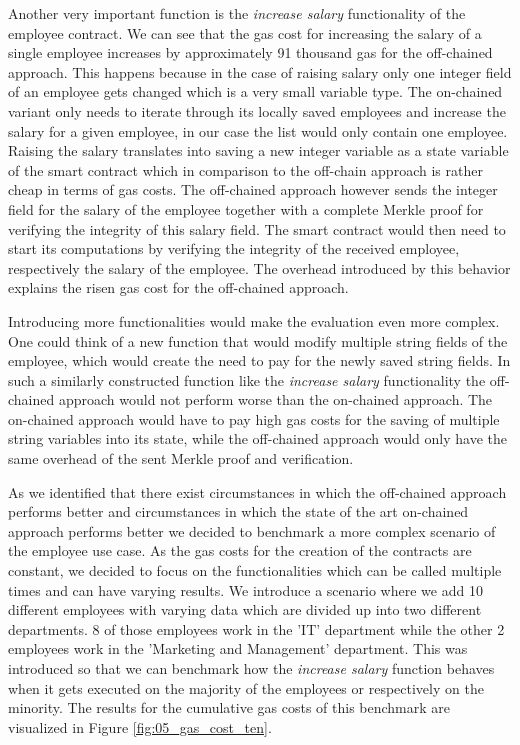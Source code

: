 Another very important function is the \textit{increase salary} functionality of the employee contract.
We can see that the gas cost for increasing the salary of a single employee increases by approximately 91 thousand gas for the off-chained approach.
This happens because in the case of raising salary only one integer field of an employee gets changed which is a very small variable type.
The on-chained variant only needs to iterate through its locally saved employees and increase the salary for a given employee, in our case the list would only contain one employee.
Raising the salary translates into saving a new integer variable as a state variable of the smart contract which in comparison to the off-chain approach is rather cheap in terms of gas costs.
The off-chained approach however sends the integer field for the salary of the employee together with a complete Merkle proof for verifying the integrity of this salary field.
The smart contract would then need to start its computations by verifying the integrity of the received employee, respectively the salary of the employee.
The overhead introduced by this behavior explains the risen gas cost for the off-chained approach.

Introducing more functionalities would make the evaluation even more complex.
One could think of a new function that would modify multiple string fields of the employee, which would create the need to pay for the newly saved string fields.
In such a similarly constructed function like the \textit{increase salary} functionality the off-chained approach would not perform worse than the on-chained approach.
The on-chained approach would have to pay high gas costs for the saving of multiple string variables into its state, while the off-chained approach would only have the same overhead of the sent Merkle proof and verification.

As we identified that there exist circumstances in which the off-chained approach performs better and circumstances in which the state of the art on-chained approach performs better we decided to benchmark a more complex scenario of the employee use case.
As the gas costs for the creation of the contracts are constant, we decided to focus on the functionalities which can be called multiple times and can have varying results.
We introduce a scenario where we add 10 different employees with varying data which are divided up into two different departments.
8 of those employees work in the 'IT' department while the other 2 employees work in the 'Marketing and Management' department.
This was introduced so that we can benchmark how the \textit{increase salary} function behaves when it gets executed on the majority of the employees or respectively on the minority.
The results for the cumulative gas costs of this benchmark are visualized in Figure \ref{fig:05_gas_cost_ten}.

